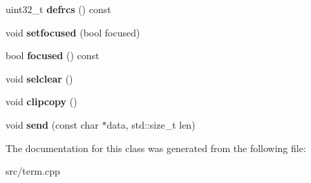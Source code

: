 \begin{DoxyCompactItemize}
uint32\+\_\+t {\bfseries defrcs} () const
\item 
\mbox{\label{classTermImpl_a2266fa9606e2a66333d5fbf3ea43c814}} 
void {\bfseries setfocused} (bool focused)
\item 
\mbox{\label{classTermImpl_a2bd6563e631d07418a50fcc78f8a7c1e}} 
bool {\bfseries focused} () const
\item 
\mbox{\label{classTermImpl_ad581557f9e8ea32c315a67058cb21fd9}} 
void {\bfseries selclear} ()
\item 
\mbox{\label{classTermImpl_a52f74c9e05568346a07f42e525d8be11}} 
void {\bfseries clipcopy} ()
\item 
\mbox{\label{classTermImpl_a275ac2d2eef0556ca21c6b7951b58b4e}} 
void {\bfseries send} (const char $\ast$data, std\+::size\+\_\+t len)
\end{DoxyCompactItemize}


The documentation for this class was generated from the following file\+:\begin{DoxyCompactItemize}
\item 
src/term.\+cpp\end{DoxyCompactItemize}
